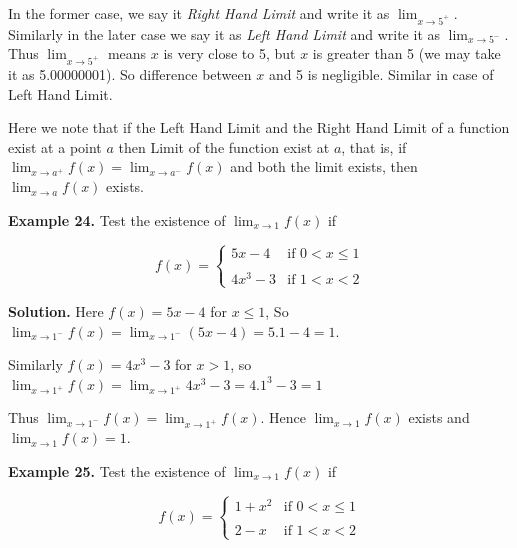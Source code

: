 \documentclass[../../main.tex]{subfiles}
\begin{document}
In the former case, we say it \emph{Right Hand Limit} and write it as $\lim_{x \rightarrow 5^+}$. Similarly in the later case we say it as \emph{Left Hand Limit} and write it as $\lim_{x \rightarrow 5^-}$. Thus $\lim_{x \rightarrow 5^+}$ means $x$ is very close to 5, but $x$ is greater than 5 (we may take it as 5.00000001). So difference between $x$ and 5 is negligible. Similar in case of Left Hand Limit.

Here we note that if the Left Hand Limit and the Right Hand Limit of a function exist at a point $a$ then Limit of the function exist at $a$, that is, if $\lim_{x\rightarrow a^+}{f(x)} = \lim_{x\rightarrow a^-}{f(x)}$ and both the limit exists, then $\lim_{x\rightarrow a}f(x)$ exists.

\vspace{0.2cm}
\textbf{Example 24.} 
\vspace{0.2cm}
Test the existence of $\lim_{x\rightarrow 1}f(x)$ if 

\begin{equation*}
    f(x) =
\begin{cases}
    5x-4     & \text{if    }     0<x \leq1 \\\\
    4x^3-3   & \text{if    }     1<x<2
\end{cases}  
\end{equation*}

\textbf{Solution.} Here $f(x) = 5x-4$ for $x\leq 1$,  So $\lim_{x\rightarrow 1^-}f(x) = \lim_{x\rightarrow 1^-}(5x-4) = 5.1-4 = 1$.

Similarly $ f(x) = 4x^3-3$ for $x>1$, so $\lim_{x\rightarrow 1^+}f(x) = \lim_{x\rightarrow 1^+}{4x^3-3} = 4.1^3-3 = 1$

Thus $\lim_{x\rightarrow 1^-}f(x)=\lim_{x\rightarrow 1^+}f(x)$. Hence $\lim_{x\rightarrow 1}f(x)$ exists and $\lim_{x\rightarrow 1}{f(x)} = 1$. 

\vspace{0.2cm}
\textbf{Example 25.} 
\vspace{0.2cm}
Test the existence of $\lim_{x\rightarrow 1}f(x)$ if 

\begin{equation*}
    f(x) =
\begin{cases}
    1+x^2     & \text{if   }     0<x \leq1 \\\\
    2-x       & \text{if   }     1<x<2
\end{cases}  
\end{equation*}
\end{document}
